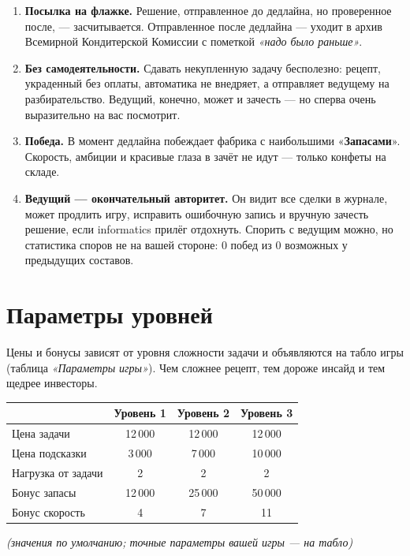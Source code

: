 \documentclass[12pt,a4paper]{article}
\newcommand{\term}[1]{«\textbf{#1}»}
\begin{document}
\begin{enumerate}[leftmargin=1.6em,itemsep=2pt]
\item \textbf{Посылка на флажке.} Решение, отправленное до дедлайна,
но проверенное после, --- засчитывается. Отправленное после дедлайна ---
уходит в архив Всемирной Кондитерской Комиссии с пометкой
\emph{«надо было раньше»}.

\item \textbf{Без самодеятельности.} Сдавать некупленную задачу
бесполезно: рецепт, украденный без оплаты, автоматика не внедряет,
а отправляет ведущему на разбирательство. Ведущий, конечно, может
и зачесть --- но сперва очень выразительно на вас посмотрит.

\item \textbf{Победа.} В момент дедлайна побеждает фабрика с наибольшими
\term{Запасами}. Скорость, амбиции и красивые глаза в зачёт не идут ---
только конфеты на складе.

\item \textbf{Ведущий --- окончательный авторитет.} Он видит все сделки
в журнале, может продлить игру, исправить ошибочную запись и вручную
зачесть решение, если informatics прилёг отдохнуть. Спорить с ведущим
можно, но статистика споров не на вашей стороне: 0 побед из 0 возможных
у предыдущих составов.

\end{enumerate}

\section*{Параметры уровней}

Цены и бонусы зависят от уровня сложности задачи и объявляются
на табло игры (таблица \emph{«Параметры игры»}). Чем сложнее рецепт,
тем дороже инсайд и тем щедрее инвесторы.

\begin{center}
\begin{tabular}{lccc}
\toprule
 & \textbf{Уровень 1} & \textbf{Уровень 2} & \textbf{Уровень 3} \\
\midrule
Цена задачи        & 12\,000 & 12\,000 & 12\,000 \\
Цена подсказки     & 3\,000  & 7\,000  & 10\,000 \\
Нагрузка от задачи & 2       & 2       & 2       \\
Бонус запасы       & 12\,000 & 25\,000 & 50\,000 \\
Бонус скорость     & 4       & 7       & 11      \\
\bottomrule
\end{tabular}

\small\emph{(значения по умолчанию; точные параметры вашей игры --- на табло)}
\end{center}
\end{document}
